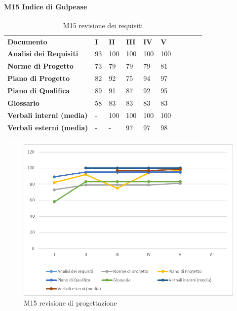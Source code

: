 \paragraph{M15 Indice di Gulpease}\mbox{}
\begin{longtable} {						
		>{}p{50mm}  		
		>{}p{8mm}		
		>{}p{8mm}		
		>{}p{8mm}		
		>{}p{8mm}		
		>{}p{8mm}		
		>{}p{8mm}
		>{}p{8mm}
		>{}p{8mm}
		>{}p{8mm}				
	}			
	\rowcolor{gray!50}
	\textbf{Documento} & \textbf{I} & \textbf{II} & \textbf{III} & \textbf{IV} & \textbf{V} \TBstrut \\ [2mm]
	\textbf{Analisi dei Requisiti} & 93 & 100 & 100 & 100 & 100 \TBstrut \\ [2mm]
	\textbf{Norme di Progetto} & 73 & 79 & 79 & 79 & 81 \TBstrut \\ [2mm]
	\textbf{Piano di Progetto} & 82 & 92 & 75 & 94 & 97 \TBstrut \\ [2mm]
	\textbf{Piano di Qualifica} & 89 & 91 & 87 & 92 & 95 \TBstrut \\ [2mm]
	\textbf{Glossario} & 58 & 83 & 83 & 83 & 83 \TBstrut \\ [2mm]
	\textbf{Verbali interni (media)} & - & 100 & 100 & 100 & 100 \TBstrut \\ [2mm]
	\textbf{Verbali esterni (media)} & - & - & 97 & 97 & 98 \TBstrut \\ [2mm]
	\rowcolor{white}
	\caption{M15 revisione dei requisiti}
\end{longtable}
\begin{figure}[H] 	
	\includegraphics[width=\linewidth]{./img/grafici/RP18.png}	
	\caption{M15 revisione di progettazione}	
\end{figure}
